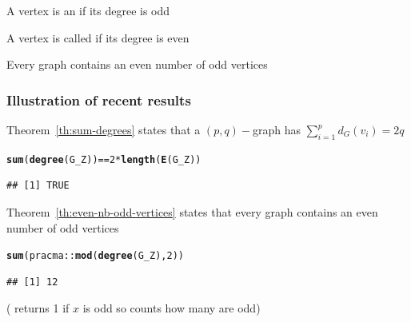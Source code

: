 \documentclass[aspectratio=169]{beamer}\usepackage[]{graphicx}\usepackage[]{xcolor}
\makeatletter
\newcommand{\hlnum}[1]{\textcolor[rgb]{0.686,0.059,0.569}{#1}}%
\newcommand{\hlopt}[1]{\textcolor[rgb]{0,0,0}{#1}}%
\newcommand{\hldef}[1]{\textcolor[rgb]{0.345,0.345,0.345}{#1}}%
\newcommand{\hlkwd}[1]{\textcolor[rgb]{0.737,0.353,0.396}{\textbf{#1}}}%
\newenvironment{kframe}{%
 \def\at@end@of@kframe{}%
 \ifinner\ifhmode%
  \def\at@end@of@kframe{\end{minipage}}%
  \begin{minipage}{\columnwidth}%
 \fi\fi%
 \def\FrameCommand##1{\hskip\@totalleftmargin \hskip-\fboxsep
 \colorbox{shadecolor}{##1}\hskip-\fboxsep
     \hskip-\linewidth \hskip-\@totalleftmargin \hskip\columnwidth}%
 \MakeFramed {\advance\hsize-\width
   \@totalleftmargin\z@ \linewidth\hsize
   \@setminipage}}%
 {\par\unskip\endMakeFramed%
 \at@end@of@kframe}
\newenvironment{knitrout}{}{} %
\makeatother
\begin{document}



\begin{frame}
\begin{definition}
A vertex is an  if its degree is odd
\end{definition}
\vfill
\begin{definition}
A vertex is called  if its degree is even
\end{definition}
\vfill
\begin{importanttheorem}\label{th:even-nb-odd-vertices}
Every graph contains an even number of odd vertices
\end{importanttheorem}
\end{frame}

\begin{frame}[fragile]\frametitle{Illustration of recent results}
Theorem~\ref{th:sum-degrees} states that a $(p,q)-$graph has $\sum_{i=1}^{p}d_G(v_i)=2q$
\begin{knitrout}
\color{fgcolor}\begin{kframe}
\begin{alltt}
\hlkwd{sum}\hldef{(}\hlkwd{degree}\hldef{(G_Z))} \hlopt{==} \hlnum{2}\hlopt{*}\hlkwd{length}\hldef{(}\hlkwd{E}\hldef{(G_Z))}
\end{alltt}
\begin{verbatim}
## [1] TRUE
\end{verbatim}
\end{kframe}
\end{knitrout}
\vfill
Theorem~\ref{th:even-nb-odd-vertices} states that every graph contains an even number of odd vertices
\begin{knitrout}
\color{fgcolor}\begin{kframe}
\begin{alltt}
\hlkwd{sum}\hldef{(pracma}\hlopt{::}\hlkwd{mod}\hldef{(}\hlkwd{degree}\hldef{(G_Z),}\hlnum{2}\hldef{))}
\end{alltt}
\begin{verbatim}
## [1] 12
\end{verbatim}
\end{kframe}
\end{knitrout}
( returns 1 if $x$ is odd so  counts how many are odd)
\end{frame}
\end{document}
